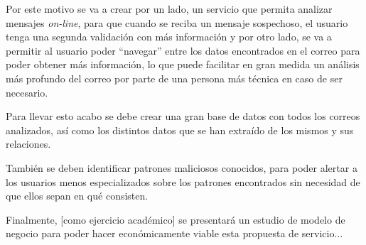 Por este motivo se va a crear por un lado, un servicio que permita analizar mensajes \textit{on-line}, para que cuando se reciba un mensaje sospechoso, el usuario tenga una segunda validación con más información y por otro lado, se va a permitir al usuario poder “navegar” entre los datos encontrados en el correo para poder obtener más información, lo que puede facilitar en gran medida un análisis más profundo del correo por parte de una persona más técnica en caso de ser necesario.

Para llevar esto acabo se debe crear una gran base de datos con todos los correos analizados, así como los distintos datos que se han extraído de los mismos y sus relaciones. 

También se deben identificar patrones maliciosos conocidos, para poder alertar a los usuarios menos especializados sobre los patrones encontrados sin necesidad de que ellos sepan en qué consisten.


 Finalmente, [como ejercicio académico] se presentará un estudio de modelo de negocio para poder hacer económicamente viable esta propuesta de servicio...